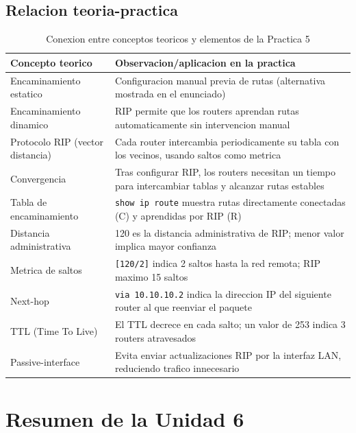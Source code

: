 \subsection{Relacion teoria-practica}

\begin{table}[htbp]
\centering
\small
\caption{Conexion entre conceptos teoricos y elementos de la Practica 5}
\begin{tabularx}{\textwidth}{@{}lX@{}}
\toprule
\textbf{Concepto teorico} & \textbf{Observacion/aplicacion en la practica} \\
\midrule
Encaminamiento estatico & Configuracion manual previa de rutas (alternativa mostrada en el enunciado) \\
Encaminamiento dinamico & RIP permite que los routers aprendan rutas automaticamente sin intervencion manual \\
Protocolo RIP (vector distancia) & Cada router intercambia periodicamente su tabla con los vecinos, usando saltos como metrica \\
Convergencia & Tras configurar RIP, los routers necesitan un tiempo para intercambiar tablas y alcanzar rutas estables \\
Tabla de encaminamiento & \texttt{show ip route} muestra rutas directamente conectadas (C) y aprendidas por RIP (R) \\
Distancia administrativa & 120 es la distancia administrativa de RIP; menor valor implica mayor confianza \\
Metrica de saltos & \texttt{[120/2]} indica 2 saltos hasta la red remota; RIP maximo 15 saltos \\
Next-hop & \texttt{via 10.10.10.2} indica la direccion IP del siguiente router al que reenviar el paquete \\
TTL (Time To Live) & El TTL decrece en cada salto; un valor de 253 indica 3 routers atravesados \\
Passive-interface & Evita enviar actualizaciones RIP por la interfaz LAN, reduciendo trafico innecesario \\
\bottomrule
\end{tabularx}
\end{table}


\section{Resumen de la Unidad 6}

